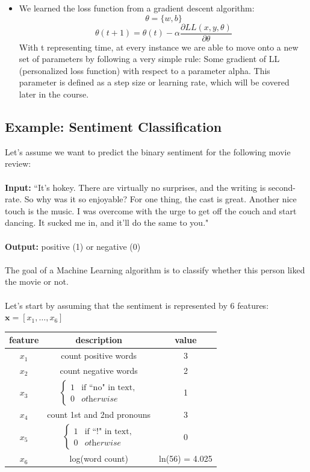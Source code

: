 \documentclass{article}
\begin{document}
\begin{itemize}
    \item We learned the loss function from a gradient descent algorithm:
    $$
    \theta = \{w,b\}
    $$
    $$
    \theta(t + 1) = \theta(t) - \alpha\frac{\partial{LL(x,y,\theta)}}{\partial\theta}
    $$
    With t representing time, at every instance we are able to move onto a new set of parameters by following a very simple rule: Some gradient of LL (personalized loss function) with respect to a parameter alpha. This parameter is defined as a step size or learning rate, which will be covered later in the course.
\end{itemize}

\subsection{Example: Sentiment Classification}
Let's assume we want to predict the binary sentiment for the following movie review:\\~\\
\textbf{Input:} ``It's hokey. There are virtually no surprises, and the writing is second-rate. So why was it so enjoyable? For one thing, the cast is great. Another nice touch is the music. I was overcome with the urge to get off the couch and start dancing. It sucked me in, and it'll do the same to you."\\~\\
\textbf{Output:} positive (1) or negative (0)\\~\\
The goal of a Machine Learning algorithm is to classify whether this person liked the movie or not.\\~\\
Let's start by assuming that the sentiment is represented by 6 features: $\mathbf{x} = [x_1, \dots, x_6]$
\begin{center}
\begin{tabular}{ |c|c|c| } 
 \hline
 \textbf{feature} & \textbf{description} & \textbf{value} \\ 
 \hline
 $x_1$ & count positive words &  3\\ 
 \hline
 $x_2$ & count negative words &  2\\ 
 \hline
 $x_3$ & 
    $\begin{cases}
        1     & \text{if ``no" in text}, \\
        0 & \textit{otherwise}
    \end{cases}$
 &  1\\ 
 \hline
 $x_4$ & count 1st and 2nd pronouns &  3\\ 
 \hline
 $x_5$ &
     $\begin{cases}
        1     & \text{if ``!" in text}, \\
        0 & \textit{otherwise}
    \end{cases}$
 &  0\\ 
 \hline
 $x_6$ & log(word count) &  ln(56) = 4.025\\
 \hline
\end{tabular}
\end{center}
\end{document}
